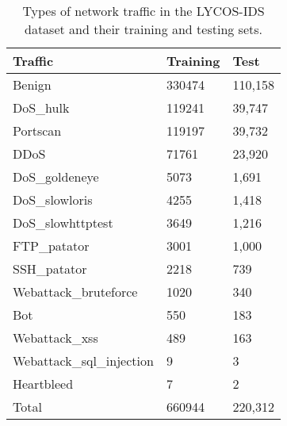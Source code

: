 
\begin{table}[h!]
\caption{Types of network traffic in the LYCOS-IDS dataset and their training and testing sets.}
\label{tab:lycos3}
\centering
\begin{tabular}{lll}
Traffic & Training & Test\\ \hline
Benign & 330474 & 110,158 \\
DoS\_hulk & 119241 & 39,747 \\
Portscan & 119197 & 39,732 \\
DDoS & 71761 & 23,920 \\
DoS\_goldeneye & 5073 & 1,691 \\
DoS\_slowloris & 4255 & 1,418 \\
DoS\_slowhttptest & 3649 & 1,216 \\
FTP\_patator & 3001 & 1,000 \\
SSH\_patator & 2218 & 739 \\
Webattack\_bruteforce & 1020 & 340 \\
Bot & 550 & 183 \\
Webattack\_xss & 489 & 163 \\
Webattack\_sql\_injection & 9 & 3 \\
Heartbleed & 7 & 2 \\
\hline
Total & 660944 &  220,312 \\
\end{tabular}
\end{table}